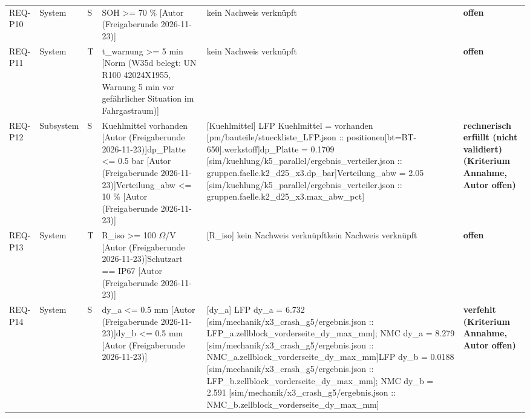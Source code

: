 \begin{longtable}{p{1.7cm}p{1.6cm}p{1.2cm}p{3.2cm}p{4.8cm}p{2.6cm}}
REQ-P10 & System & S & SOH >= 70 \% [Autor (Freigaberunde 2026-11-23)] & kein Nachweis verknüpft & \textbf{offen}\\
REQ-P11 & System & T & t\_warnung >= 5 min [Norm (W35d belegt: UN R100 42024X1955, Warnung 5 min vor gefährlicher Situation im Fahrgastraum)] & kein Nachweis verknüpft & \textbf{offen}\\
REQ-P12 & Subsystem & S & Kuehlmittel vorhanden [Autor (Freigaberunde 2026-11-23)]\newline dp\_Platte <= 0.5 bar [Autor (Freigaberunde 2026-11-23)]\newline Verteilung\_abw <= 10 \% [Autor (Freigaberunde 2026-11-23)] & [Kuehlmittel] LFP Kuehlmittel = vorhanden [pm/bauteile/stueckliste\_LFP.json :: positionen[bt=BT-650].werkstoff]\newline [dp\_Platte] dp\_Platte = 0.1709 [sim/kuehlung/k5\_parallel/ergebnis\_verteiler.json :: gruppen.faelle.k2\_d25\_x3.dp\_bar] Verteilung\_abw = 2.05 [sim/kuehlung/k5\_parallel/ergebnis\_verteiler.json :: gruppen.faelle.k2\_d25\_x3.max\_abw\_pct] & \textbf{rechnerisch erfüllt (nicht validiert) (Kriterium Annahme, Autor offen)}\\
REQ-P13 & System & T & R\_iso >= 100 $\Omega$/V [Autor (Freigaberunde 2026-11-23)]\newline Schutzart == IP67 [Autor (Freigaberunde 2026-11-23)] & [R\_iso] kein Nachweis verknüpft\newline [Schutzart] kein Nachweis verknüpft & \textbf{offen}\\
REQ-P14 & System & S & dy\_a <= 0.5 mm [Autor (Freigaberunde 2026-11-23)]\newline dy\_b <= 0.5 mm [Autor (Freigaberunde 2026-11-23)] & [dy\_a] LFP dy\_a = 6.732 [sim/mechanik/x3\_crash\_g5/ergebnis.json :: LFP\_a.zellblock\_vorderseite\_dy\_max\_mm]; NMC dy\_a = 8.279 [sim/mechanik/x3\_crash\_g5/ergebnis.json :: NMC\_a.zellblock\_vorderseite\_dy\_max\_mm]\newline [dy\_b] LFP dy\_b = 0.0188 [sim/mechanik/x3\_crash\_g5/ergebnis.json :: LFP\_b.zellblock\_vorderseite\_dy\_max\_mm]; NMC dy\_b = 2.591 [sim/mechanik/x3\_crash\_g5/ergebnis.json :: NMC\_b.zellblock\_vorderseite\_dy\_max\_mm] & \textbf{verfehlt (Kriterium Annahme, Autor offen)}\\

\end{longtable}
